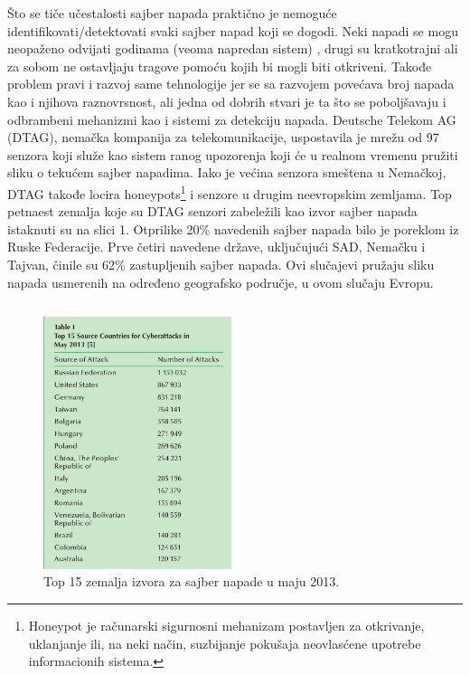 \documentclass[a4paper]{article}
\begin{document}
{Što se tiče učestalosti sajber napada praktično je nemoguće identifikovati/detektovati svaki sajber napad koji se dogodi.
Neki napadi se mogu neopaženo odvijati godinama (veoma napredan sistem) , drugi su kratkotrajni ali za sobom ne ostavljaju tragove pomoću kojih bi mogli biti otkriveni.
Takođe problem pravi i razvoj same tehnologije jer se sa razvojem povećava broj napada kao i njihova raznovrsnost, ali jedna od dobrih stvari je ta što se poboljšavaju i odbrambeni mehanizmi kao i sistemi za detekciju napada.  
Deutsche Telekom AG (DTAG), nemačka kompanija za telekomunikacije, uspostavila je mrežu od 97 senzora koji
služe kao sistem ranog upozorenja koji će u realnom vremenu pružiti  sliku o tekućem sajber napadima.
Iako je većina senzora smeštena u Nemačkoj, DTAG takođe locira honeypots\footnote{Honeypot je računarski sigurnosni mehanizam postavljen za otkrivanje, uklanjanje ili, na neki način, suzbijanje pokušaja neovlasćene upotrebe informacionih sistema.
}
i senzore u drugim neevropskim zemljama.
\newline
Top petnaest zemalja koje su DTAG senzori zabeležili kao izvor sajber napada istaknuti su na slici 1.
Otprilike 20\% navedenih sajber napada bilo je poreklom iz Ruske Federacije.
Prve četiri navedene države, uključujući SAD, Nemačku i Tajvan, činile su 62\% zastupljenih sajber napada.
Ovi slučajevi pružaju sliku napada usmerenih na određeno geografsko područje, u ovom slučaju Evropu.

 


\begin{verbatim}
\end{verbatim}

\begin{figure}[h!]
  \centering
  \begin{center}
  \includegraphics[width=55mm]{slika1.jpg}
  \end{center}
  \caption{Top 15 zemalja izvora za sajber napade u maju 2013. \cite{Overview of current cyber attacks}}
  \label{fig:vr1}
\end{figure}

}
\end{document}
